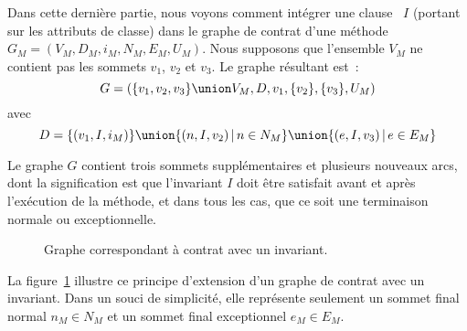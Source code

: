 Dans cette dernière partie, nous voyons comment intégrer une clause
\ainvariant~$I$ (portant sur les attributs de classe) dans le graphe de contrat
d'une méthode $G_M = (V_M, D_M, i_M, N_M, E_M, U_M)$. Nous supposons que
l'ensemble $V_M$ ne contient pas les sommets $v_1$, $v_2$ et $v_3$. Le graphe
résultant est~:
%
$$G = (
  \{v_1, v_2, v_3\} \union V_M,
  D,
  v_1,
  \{v_2\},
  \{v_3\},
  U_M
)$$
%
avec
%
$$D = \{(v_1, I, i_M)\} \union
      \{(n, I, v_2) \,\vert\, n \in N_M\} \union
      \{(e, I, v_3) \,\vert\, e \in E_M\}$$

Le graphe $G$ contient trois sommets supplémentaires et plusieurs nouveaux arcs,
dont la signification est que l'invariant $I$ doit être satisfait avant et après
l'exécution de la méthode, et dans tous les cas, que ce soit une terminaison
normale ou exceptionnelle.

\begin{figure}


\caption{\label{figure:test:invariant_graph} Graphe correspondant à contrat avec
un invariant.}

\end{figure}

\begin{example}

La figure~\ref{figure:test:invariant_graph} illustre ce principe d'extension
d'un graphe de contrat avec un invariant. Dans un souci de simplicité, elle
représente seulement un sommet final normal $n_M \in N_M$ et un sommet final
exceptionnel $e_M \in E_M$.

\end{example}
